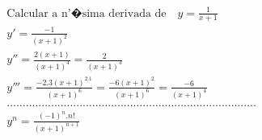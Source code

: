 \begin{ex}
\begin{align}
&\text{Calcular a n'�sima derivada de} \quad y=\frac{1}{x+1}\nonumber\\
&y'=\frac{-1}{(x+1)^2}\nonumber\\
&y''=\frac{2(x+1)}{(x+1)^4}=\frac{2}{(x+1)^3}\nonumber\\
&y'''=\frac{-2.3(x+1)^2.1}{(x+1)^6}=\frac{-6(x+1)^2}{(x+1)^6}=\frac{-6}{(x+1)^4}\nonumber\\
&...............................................................................\nonumber\\
&y^{n}=\frac{(-1)^{n}.n!}{(x+1)^{n+1}}\nonumber
\end{align}
\end{ex}